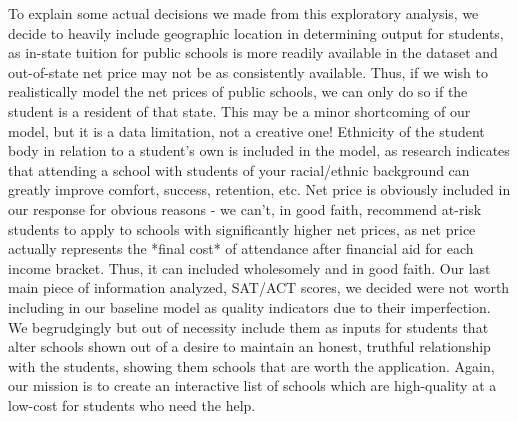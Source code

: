 \documentclass{article}\usepackage[]{graphicx}\usepackage[]{color}
\begin{document}
To explain some actual decisions we made from this exploratory analysis, we decide to heavily include geographic location in determining output for students, as in-state tuition for public schools is more readily available in the dataset and out-of-state net price may not be as consistently available. Thus, if we wish to realistically model the net prices of public schools, we can only do so if the student is a resident of that state. This may be a minor shortcoming of our model, but it is a data limitation, not a creative one! Ethnicity of the student body in relation to a student's own is included in the model, as research indicates that attending a school with students of your racial/ethnic background can greatly improve comfort, success, retention, etc. Net price is obviously included in our response for obvious reasons - we can't, in good faith, recommend at-risk students to apply to schools with significantly higher net prices, as net price actually represents the *final cost* of attendance after financial aid for each income bracket. Thus, it can included wholesomely and in good faith. Our last main piece of information analyzed, SAT/ACT scores, we decided were not worth including in our baseline model as quality indicators due to their imperfection. We begrudgingly but out of necessity include them as inputs for students that alter schools shown out of a desire to maintain an honest, truthful relationship with the students, showing them schools that are worth the application. Again, our mission is to create an interactive list of schools which are high-quality at a low-cost for students who need the help.  
\end{document}
